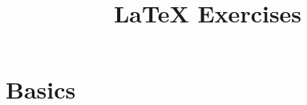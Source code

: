 \documentclass[12pt,a4paper]{article}
\title{\LaTeX{} Exercises}
\begin{document}
\maketitle


\section{Basics}


% 
% 
\end{document}
